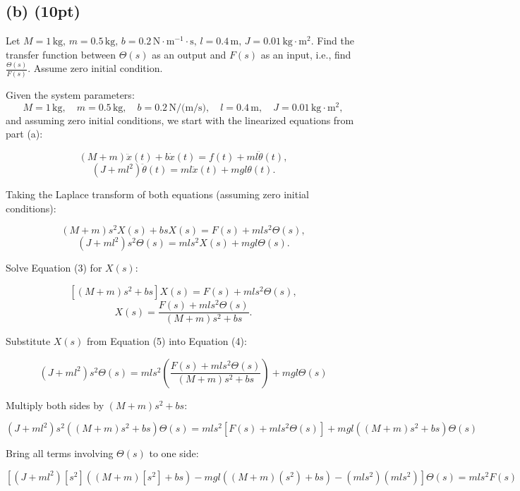 \documentclass{article}
\begin{document}
\newpage
\subsection*{(b) (10pt)}
Let \( M = 1 \, \text{kg}, \, m = 0.5 \, \text{kg}, \, b = 0.2 \, \text{N} \cdot \text{m}^{-1} \cdot \text{s}, \, l = 0.4 \, \text{m}, \, J = 0.01 \, \text{kg} \cdot \text{m}^2 \). Find the transfer function between \( \Theta(s) \) as an output and \( F(s) \) as an input, i.e., find \( \frac{\Theta(s)}{F(s)} \). Assume zero initial condition.


Given the system parameters:
\[
M = 1 \, \text{kg}, \quad m = 0.5 \, \text{kg}, \quad b = 0.2 \, \text{N/(m/s)}, \quad l = 0.4 \, \text{m}, \quad J = 0.01 \, \text{kg} \cdot \text{m}^2,
\]
and assuming zero initial conditions, we start with the linearized equations from part (a):

\begin{equation*}
(M + m) \ddot{x}(t) + b \dot{x}(t) = f(t) + ml \ddot{\theta}(t), \tag{1}
\end{equation*}
\begin{equation*}
(J + ml^2)\ddot{\theta}(t) = ml \ddot{x}(t) + mgl \theta(t). \tag{2}
\end{equation*}

Taking the Laplace transform of both equations (assuming zero initial conditions):

\[
(M + m) s^2 X(s) + b s X(s) = F(s) + ml s^2 \Theta(s), \tag{3}
\]
\[
(J + ml^2) s^2 \Theta(s) = ml s^2 X(s) + mgl \Theta(s). \tag{4}
\]

Solve Equation (3) for \( X(s) \):

\[
\left[ (M + m) s^2 + b s \right] X(s) = F(s) + ml s^2 \Theta(s),
\]
\[
X(s) = \frac{F(s) + ml s^2 \Theta(s)}{(M + m) s^2 + b s}. \tag{5}
\]

Substitute \( X(s) \) from Equation (5) into Equation (4):

\[
(J + ml^2) s^2 \Theta(s) = ml s^2 \left( \frac{F(s) + ml s^2 \Theta(s)}{(M + m) s^2 + b s} \right) + mgl \Theta(s) \tag{6}
\]

Multiply both sides by \( (M + m) s^2 + b s \):

\[
\left( J + ml^2 \right) s^2 \left( (M + m) s^2 + b s \right) \Theta(s) = ml s^2 \left[ F(s) + ml s^2 \Theta(s) \right] + mgl \left( (M + m) s^2 + b s \right) \Theta(s) \tag{7}
\]

Bring all terms involving \( \Theta(s) \) to one side:

\[
\left[(J + ml^2)[s^2]((M+m)[s^2]+bs) -mgl((M+m)(s^2)+bs)-(mls^2)(mls^2) \right] \Theta(s) = ml s^2 F(s) \tag{8}
\]
\end{document}
